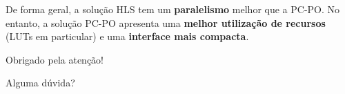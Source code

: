\documentclass{beamer}
\begin{document}
\begin{frame}
\begin{columns}
\begin{column}{0.49\textwidth}
            \end{column}
        \end{columns}

        {
            De forma geral, a solução HLS tem um \textbf{paralelismo} melhor que a PC-PO.
            No entanto, a solução PC-PO apresenta uma \textbf{melhor utilização de recursos} (LUTs
            em particular) e uma \textbf{interface mais compacta}.
        }

    \end{frame}

    \begin{frame}
        \centering \huge
        \vfill
        Obrigado pela atenção!

        Alguma dúvida?
        \vfill
    \end{frame}
\end{document}
